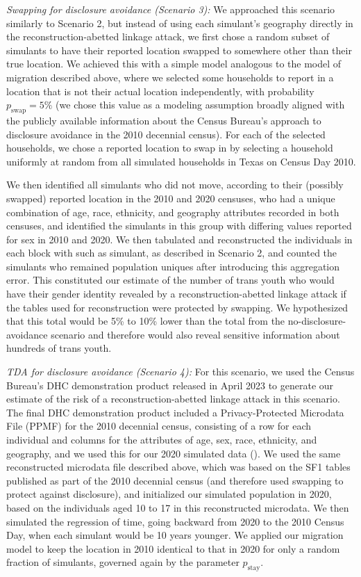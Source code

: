 \documentclass{jpc} %
\theoremstyle{plain}\newtheorem{satz}[thm]{Satz} %
\begin{document}
\emph{Swapping for disclosure avoidance (Scenario 3):} We approached this scenario similarly to Scenario 2, but instead of using each simulant's geography directly in the reconstruction-abetted linkage attack, we first chose a random subset of simulants to have their reported location swapped to somewhere other than their true location.  
We achieved this with a simple model analogous to the model of migration described above, where we selected some households to report in a location that is not their actual location independently, with probability $p_\text{swap} = 5\%$ (we chose this value as a modeling assumption broadly aligned with the  publicly available information about the Census Bureau's approach to disclosure avoidance in the 2010 decennial census).  For each of the selected households, we chose a reported location to swap in by selecting a household uniformly at random from all simulated households in Texas on Census Day 2010.

We then identified all simulants who did not move, according to their (possibly swapped) reported location in the 2010 and 2020 censuses, who had a unique combination of age, race, ethnicity, and geography attributes recorded in both censuses, and identified the simulants in this group with differing values reported for sex in 2010 and 2020.  We then tabulated and reconstructed the individuals in each block with such as simulant, as described in Scenario 2, and counted the simulants who remained population uniques after introducing this aggregation error.  This constituted our estimate of the number of trans youth who would have their gender identity revealed by a reconstruction-abetted linkage attack if the tables used for reconstruction were protected by swapping.  We hypothesized that this total would be 5\% to 10\% lower than the total from the no-disclosure-avoidance scenario and therefore would also reveal sensitive information about hundreds of trans youth.

\emph{TDA for disclosure avoidance (Scenario 4):} For this scenario, we used the Census Bureau's DHC demonstration product released in April 2023 to generate our estimate of the risk of a reconstruction-abetted linkage attack in this scenario.  The final DHC demonstration product included a Privacy-Protected Microdata File (PPMF) for the 2010 decennial census, consisting of a row for each individual and columns for the attributes of age, sex, race, ethnicity, and geography, and we used this for our 2020 simulated data (\cite{census2023demonstration}). We used the same reconstructed microdata file described above, which was based on the SF1 tables published as part of the 2010 decennial census (and therefore used swapping to protect against disclosure), and initialized our simulated population in 2020, based on the individuals aged 10 to 17 in this reconstructed microdata.  We then simulated the regression of time, going backward from 2020 to the 2010 Census Day, when each simulant would be 10 years younger.  We applied our migration model to keep the location in 2010 identical to that in 2020 for only a random fraction of simulants, governed again by the parameter $p_{\text{stay}}$.
\end{document}
